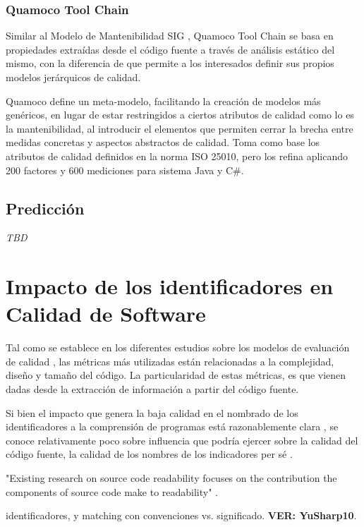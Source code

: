 \subsubsection{Quamoco Tool Chain}

Similar al Modelo de Mantenibilidad SIG \cite{Heitlager2007}, Quamoco Tool Chain \cite{Wagner2012}
se basa en propiedades extraídas desde el código fuente a través de análisis estático del mismo,
con la diferencia de que permite a los interesados definir sus propios modelos jerárquicos
de calidad.

Quamoco define un meta-modelo, facilitando la creación de modelos más genéricos, en lugar de
estar restringidos a ciertos atributos de calidad como lo es la mantenibilidad, al introducir
el elementos que permiten cerrar la brecha entre medidas concretas y aspectos abstractos de
calidad.
Toma como base los atributos de calidad definidos en la norma ISO 25010, pero los refina
aplicando 200 factores y 600 mediciones para sistema Java y C\#.

\subsection{Predicción}

\textit{TBD}

\section{Impacto de los identificadores en Calidad de Software}

Tal como se establece en los diferentes estudios sobre los modelos de evaluación de
calidad \cite{XXX}, las métricas más utilizadas están relacionadas a la complejidad,
diseño y tamaño del código.
La particularidad de estas métricas, es que vienen dadas desde la extracción de
información a partir del código fuente.

Si bien el impacto que genera la baja calidad en el nombrado de los identificadores a la
comprensión de programas está razonablemente clara \cite{DeiBenbockPizka05,Lawrie2007,Lawrie2006},
se conoce relativamente poco sobre influencia que podría ejercer sobre la calidad del código fuente,
la calidad de los nombres de los indicadores per sé \cite{ButlerWemelingerYu10}.

"Existing research on source code readability focuses on the contribution the
components of source code make to readability" \cite{Buse2008}.

identificadores, y matching con convenciones vs. significado. \textbf{VER: YuSharp10}.

